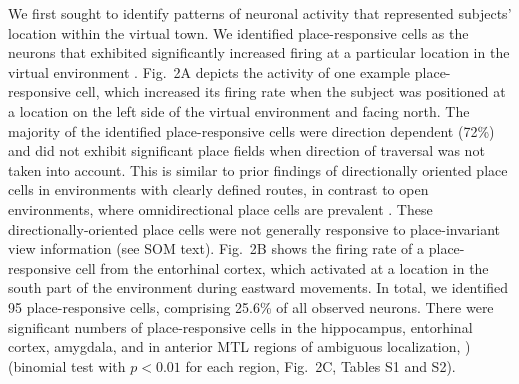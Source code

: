 % 
We first sought to identify patterns of neuronal activity that represented subjects' location within the virtual town. We identified place-responsive cells as the neurons that exhibited significantly increased firing at a particular location in the virtual environment \cite{suppnote}. Fig.~2A depicts the activity of one example place-responsive cell, which increased its firing rate when the subject was positioned at a location on the left side of the virtual environment and facing north.  The majority of the identified place-responsive cells were direction dependent (72\%) and did not exhibit significant place fields when direction of traversal was not taken into account.  This is similar to prior findings of directionally oriented place cells in environments with clearly defined routes, in contrast to open environments, where omnidirectional place cells are prevalent \cite{MullEtal94,EkstEtal03}.  These directionally-oriented place cells were not generally responsive to place-invariant view information (see SOM text). Fig.~2B shows the firing rate of a place-responsive cell from the entorhinal cortex, which activated at a location in the south part of the environment during eastward movements.  In total, we identified 95 place-responsive cells, comprising 25.6\% of all observed neurons. There were significant numbers of place-responsive cells in the hippocampus, entorhinal cortex, amygdala, and in anterior MTL regions of ambiguous localization, \cite{suppnote}) (binomial test with $p<0.01$ for each region, Fig.~2C, Tables S1 and S2).

